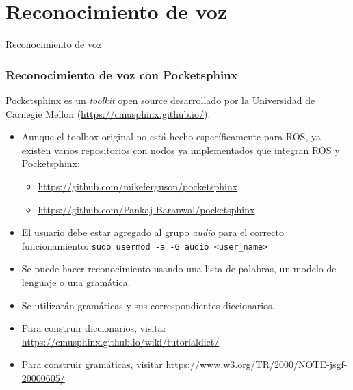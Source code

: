 \section{Reconocimiento de voz}

\begin{frame}
  \Huge
  Reconocimiento de voz
\end{frame}

\begin{frame}\frametitle{Reconocimiento de voz con Pocketsphinx}
  Pocketsphinx es un \textit{toolkit} open source desarrollado por la Universidad de Carnegie Mellon (\url{https://cmusphinx.github.io/}).
  \begin{itemize}
  \item Aunque el toolbox original no está hecho específicamente para ROS, ya existen varios repositorios con nodos ya implementados que integran ROS y Pocketsphinx:
    \begin{itemize}
    \item \url{https://github.com/mikeferguson/pocketsphinx}
    \item \url{https://github.com/Pankaj-Baranwal/pocketsphinx}
    \end{itemize}
  \item El usuario debe estar agregado al grupo \textit{audio} para el correcto funcionamiento: \texttt{sudo usermod -a -G audio <user\_name>}
  \end{itemize}
  \begin{itemize}
  \item Se puede hacer reconocimiento usando una lista de palabras, un modelo de lenguaje o una gramática.
  \item Se utilizarán gramáticas y sus correspondientes diccionarios.
  \item Para construir diccionarios, visitar \url{https://cmusphinx.github.io/wiki/tutorialdict/}
  \item Para construir gramáticas, visitar \url{https://www.w3.org/TR/2000/NOTE-jsgf-20000605/}
  \end{itemize}
\end{frame}

